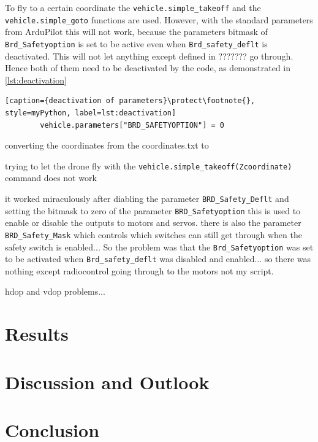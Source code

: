\documentclass[svgnames]{article}
\begin{document}
	To fly to a certain coordinate the \lstinline|vehicle.simple_takeoff| and the \lstinline|vehicle.simple_goto| functions are used. However, with the standard parameters from ArduPilot this will not work, because the parameters bitmask of  \lstinline|Brd_Safetyoption| is set to be active even when \lstinline|Brd_safety_deflt| is deactivated. 
	This will not let anything except defined in ??????? go through. Hence both of them need to be deactivated by the code, as demonstrated in \cref{lst:deactivation}
	\begin{lstlisting}[caption={deactivation of parameters}\protect\footnote{}, style=myPython, label=lst:deactivation]
		vehicle.parameters["BRD_SAFETYOPTION"] = 0
	\end{lstlisting}
	
	
	converting the coordinates from the coordinates.txt to 
	
	trying to let the drone fly with the \lstinline|vehicle.simple_takeoff(Zcoordinate)| command does not work
	
	it worked miraculously after diabling the parameter \lstinline|BRD_Safety_Deflt| and setting the bitmask to zero of the parameter \lstinline|BRD_Safetyoption| 
	this is used to enable or disable the outputs to motors and servos. there is also the parameter \lstinline|BRD_Safety_Mask| which controls which switches can still get through when the safety switch is enabled... So the problem was that the \lstinline|Brd_Safetyoption| was set to be activated when \lstinline|Brd_safety_deflt| was disabled and enabled... so there was nothing except radiocontrol going through to the motors not my script.
	
	
	hdop and vdop problems...
	
	\section{Results}
	\section{Discussion and Outlook}
	\section{Conclusion}
	
	\appendixpage
	\printbibliography[
		heading=bibintoc,
		title={Bibliography}
	]
	\pagebreak
	\listoftables
	\pagebreak
	\listoffigures	
	\pagebreak
	\printglossary[type=\acronymtype]
	
\end{document}
